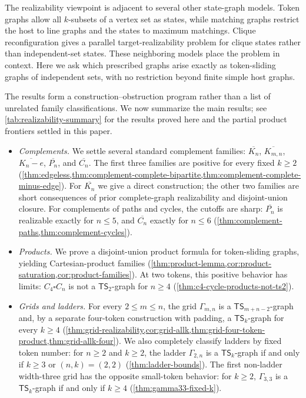 \documentclass[a4paper]{article}
\theoremstyle{plain}
\theoremstyle{definition}
\newcommand{\TSsym}{\mathsf{TS}}
\numberwithin{equation}{section}
\begin{document}
The realizability viewpoint is adjacent to several other state-graph models.
Token graphs allow all $k$-subsets of a vertex set as states, while matching graphs restrict the host to line graphs and the states to maximum matchings.
Clique reconfiguration gives a parallel target-realizability problem for clique states rather than independent-set states.
These neighboring models place the problem in context.
Here we ask which prescribed graphs arise exactly as token-sliding graphs of independent sets, with no restriction beyond finite simple host graphs.

The results form a construction--obstruction program rather than a list of unrelated family classifications.
We now summarize the main results; see \cref{tab:realizability-summary} for the results proved here and the partial product frontiers settled in this paper.

\begin{itemize}
\item \emph{Complements.}
We settle several standard complement families: $\overline{K_n}$, $\overline{K_{m,n}}$, $\overline{K_n-e}$, $\overline{P_n}$, and $\overline{C_n}$.
The first three families are positive for every fixed $k\ge 2$ (\cref{thm:edgeless,thm:complement-complete-bipartite,thm:complement-complete-minus-edge}).
For $\overline{K_n}$ we give a direct construction; the other two families are short consequences of prior complete-graph realizability and disjoint-union closure.
For complements of paths and cycles, the cutoffs are sharp: $\overline{P_n}$ is realizable exactly for $n\le 5$, and $\overline{C_n}$ exactly for $n\le 6$ (\cref{thm:complement-paths,thm:complement-cycles}).

\item \emph{Products.}
We prove a disjoint-union product formula for token-sliding graphs, yielding Cartesian-product families (\cref{thm:product-lemma,cor:product-saturation,cor:product-families}).
At two tokens, this positive behavior has limits: $C_4\square C_n$ is not a $\TSsym_2$-graph for $n\ge 4$ (\cref{thm:c4-cycle-products-not-ts2}).

\item \emph{Grids and ladders.}
For every $2\le m\le n$, the grid $\Gamma_{m,n}$ is a $\TSsym_{m+n-2}$-graph and, by a separate four-token construction with padding, a $\TSsym_k$-graph for every $k\ge 4$ (\cref{thm:grid-realizability,cor:grid-allk,thm:grid-four-token-product,thm:grid-allk-four}).
We also completely classify ladders by fixed token number: for $n\ge 2$ and $k\ge 2$, the ladder $\Gamma_{2,n}$ is a $\TSsym_k$-graph if and only if $k\ge 3$ or $(n,k)=(2,2)$ (\cref{thm:ladder-bounds}).
The first non-ladder width-three grid has the opposite small-token behavior: for $k\ge 2$, $\Gamma_{3,3}$ is a $\TSsym_k$-graph if and only if $k\ge 4$ (\cref{thm:gamma33-fixed-k}).
\end{itemize}
\end{document}
